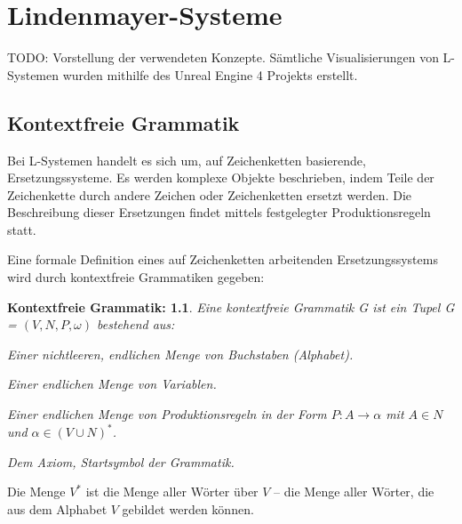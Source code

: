 \chapter{Lindenmayer-Systeme}

TODO: Vorstellung der verwendeten Konzepte. Sämtliche Visualisierungen von L-Systemen wurden mithilfe des Unreal Engine 4 Projekts erstellt.

\section{Kontextfreie Grammatik}

Bei L-Systemen handelt es sich um, auf Zeichenketten basierende, Ersetzungssysteme. Es werden komplexe Objekte beschrieben, indem Teile der Zeichenkette durch andere Zeichen oder Zeichenketten ersetzt werden. Die Beschreibung dieser Ersetzungen findet mittels festgelegter Produktionsregeln statt. \cite[S.2]{ABOP:04} 

Eine formale Definition eines auf Zeichenketten arbeitenden Ersetzungssystems wird durch kontextfreie Grammatiken gegeben:

\newtheorem{defKontextfreieGrammatik}{Kontextfreie Grammatik:}[chapter]
\begin{defKontextfreieGrammatik}
	Eine kontextfreie Grammatik G ist ein Tupel G = $(V, N, P, \omega)$ bestehend aus:
	
	\begin{description}[labelindent]
		\item[\boldmath$V$] Einer nichtleeren, endlichen Menge von Buchstaben (Alphabet).\\
		
		\item[\boldmath$N$] Einer endlichen Menge von Variablen.\\
		
		\item[\boldmath$P$] Einer endlichen Menge von Produktionsregeln in der Form $P: A \rightarrow \alpha$ mit $A \in N$ und $\alpha \in (V \cup N )^*$.\\
		
		\item[\boldmath$\omega \in N$] Dem Axiom, Startsymbol der Grammatik.\\
		
	\end{description}
	\cite[S.343]{ThI:14}
\end{defKontextfreieGrammatik}

Die Menge $V^*$ ist die Menge aller Wörter über $V$ -- die Menge aller Wörter, die aus dem Alphabet $V$ gebildet werden können. \cite[S.70]{ThI:14} 

